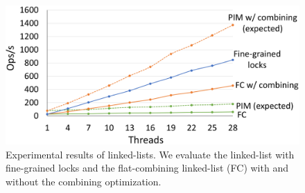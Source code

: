\begin{figure}[ht!]
    \centering
    \includegraphics[width=1.0\linewidth]{linkedlist_data.eps} %
    \caption{Experimental results of linked-lists. We evaluate the linked-list with fine-grained locks 
        and the flat-combining linked-list (FC) with and without the combining optimization.}
   \label{figure:linkedlist_data}
\end{figure}


